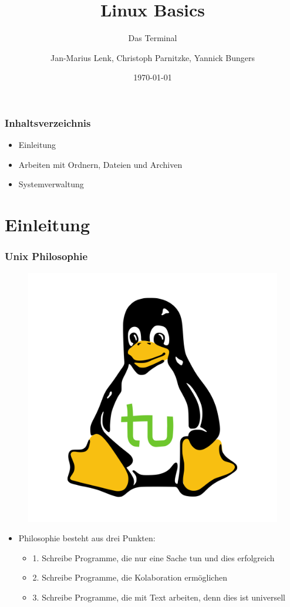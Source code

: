 \documentclass[12pt,utf8]{beamer}
\title{Linux Basics}
\subtitle{Das Terminal}
\author[J.-M. Lenk, C. Parnitzke, Y. Bungers]{Jan-Marius Lenk, Christoph Parnitzke, Yannick Bungers}
\institute[FOSS AG]{Free and Open Source Software AG\\ Fakultät für Informatik}
\date{\today}
\begin{document}
\titlepage

\begin{frame}
\frametitle{Inhaltsverzeichnis}
\begin{itemize}
	\item Einleitung
	\item Arbeiten mit Ordnern, Dateien und Archiven
	\item Systemverwaltung
\end{itemize}
\end{frame}

\section{Einleitung}
\begin{frame}
\frametitle{Unix Philosophie}
\begin{figure}
\includegraphics[scale=0.15]{res/tuX_tu.png}
\end{figure}
\begin{itemize}
	\item Philosophie besteht aus drei Punkten:
	\begin{itemize}
		\item 1. Schreibe Programme, die nur eine Sache tun und dies erfolgreich
		\item 2. Schreibe Programme, die Kolaboration ermöglichen
		\item 3. Schreibe Programme, die mit Text arbeiten, denn dies ist universell
	\end{itemize}
\end{itemize}
\end{frame}
\end{document}
